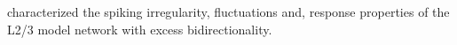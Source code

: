characterized the spiking irregularity, fluctuations and, response properties of the L2/3 model network with excess bidirectionality.  \\


